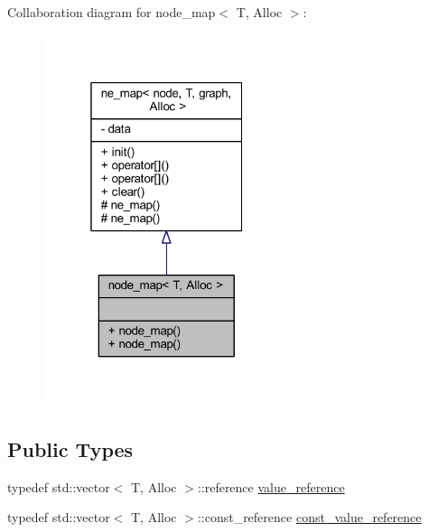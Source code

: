Collaboration diagram for node\+\_\+map$<$ T, Alloc $>$\+:\nopagebreak
\begin{figure}[H]
\begin{center}
\leavevmode
\includegraphics[width=205pt]{classnode__map__coll__graph}
\end{center}
\end{figure}
\subsection*{Public Types}
\begin{DoxyCompactItemize}
\item 
typedef std\+::vector$<$ T, Alloc $>$\+::reference \mbox{\hyperlink{classne__map_a3de60750d102f8992a215b0fe645014d}{value\+\_\+reference}}
\item 
typedef std\+::vector$<$ T, Alloc $>$\+::const\+\_\+reference \mbox{\hyperlink{classne__map_ad2be1a01de53940aee1282ec0e34f0f7}{const\+\_\+value\+\_\+reference}}
\end{DoxyCompactItemize}
